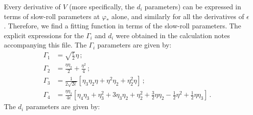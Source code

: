 \documentclass[prd, onecolumn, floatfix, letterpaper, nofootinbib, amsmath, amssymb, superscriptaddress]{revtex4}
\renewcommand{\(}{\left(}
\renewcommand{\)}{\right)}
\renewcommand{\[}{\left[}
\renewcommand{\]}{\right]}
\begin{document}
Every derivative of $V$ (more specifically, the $d_i$ parameters) can be expressed in terms of slow-roll parameters at $\varphi_*$ alone, and similarly for all the derivatives of $\epsilon$. Therefore, we find a fitting function in terms of the slow-roll parameters. The explicit expressions for the $\Gamma_i$ and $d_i$ were obtained in the calculation notes accompanying this file. The $\Gamma_i$ parameters are given by:
\begin{align}
	\Gamma_1&=\sqrt{\frac{\epsilon}{2}}\eta\,;\\
	\Gamma_2&=\frac{\eta\eta_2}{2}+\frac{\eta^2}{4}\,;\\
	\Gamma_3&=\frac{1}{2\sqrt{2\epsilon}}\left[ \eta_3\eta_2\eta+\eta^2\eta_2+\eta_2^2\eta \right]\, ;\\
	\Gamma_4&= \frac{\eta\eta_2}{4\epsilon}\left[ \eta_4\eta_3+\eta_3^2+3\eta_3\eta_2+\eta_2^2+\frac{3}{2}\eta\eta_2 -\frac{1}{2}\eta^2+\frac{1}{2}\eta\eta_3 \right]\, .
\end{align}
The $d_i$ parameters are given by:
\end{document}

